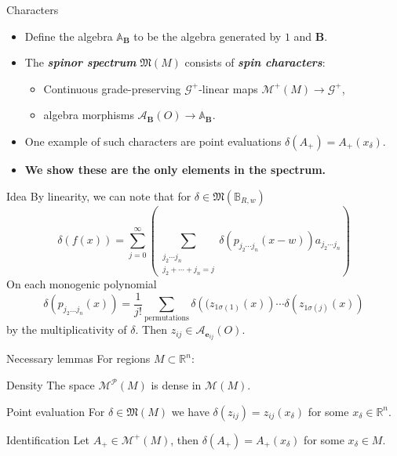 \documentclass[aspectratio=169,handout]{beamer}
\newcommand\boldgreen[1]{\textcolor{lighter_csu_green}{\emph{\textbf{#1}}}}
\newcommand\boldgold[1]{\textcolor{csu_gold}{\textbf{#1}}}
\newcommand{\R}{\mathbb{R}}
\newcommand{\algebra}{\mathcal{A}}
\newcommand{\G}{\mathcal{G}}
\newcommand{\characters}{\mathfrak{M}}
\newcommand{\monogenics}{\mathcal{M}}
\newcommand{\ball}{\mathbb{B}}
\newcommand{\blade}[1]{\boldsymbol{#1}}
\newcommand{\bivector}{\blade{B}}
\begin{document}
\begin{frame}{Characters}
\vfill
\begin{itemize}
\pause
\item Define the algebra $\mathbb{A}_{\bivector}$ to be the algebra generated by $1$ and $\bivector$.
\pause
\item The \boldgreen{spinor spectrum} $\characters(M)$ consists of \boldgreen{spin characters}:
\begin{itemize}
  \item Continuous grade-preserving $\G^+$-linear maps $\monogenics^+(M) \to \G^+$,
  \item algebra morphisms $\algebra_{\bivector}(O) \to \mathbb{A}_{\bivector}$.
\end{itemize}
\pause
\item One example of such characters are point evaluations $\delta(A_+)=A_+(x_\delta)$.
\pause
\item \boldgold{We show these are the only elements in the spectrum.}
\end{itemize}
\vfill
\end{frame}

\begin{frame}{Idea}
\vfill
\pause By linearity, we can note that for $\delta \in \characters(\ball_{R,w})$
\[
\delta(f(x)) = \sum_{j=0}^\infty \left(\sum_{\substack{{j_2 \cdots j_n} \\ {j_2 + \cdots + j_n = j}}} \delta(p_{j_2 \cdots j_n} (x-w)) a_{j_2 \cdots j_n} \right)
\]
\pause On each monogenic polynomial
\[
\delta(p_{j_2 \dots j_n}(x)) = \frac{1}{j!} \sum_{\textrm{permutations}}\delta\left((z_{1\sigma(1)}(x)\right) \cdots \delta\left(z_{1\sigma(j)}(x)\right)
\]
by the multiplicativity of $\delta$. \pause Then $z_{ij} \in \algebra_{\blade{e}_{ij}}(O)$.
\vfill
\end{frame}


\begin{frame}{Necessary lemmas}
\vfill
\pause
For regions $M\subset \R^n$:
\pause
\begin{lemm*}{Density}{}
The space $\monogenics^\mathcal{P}(M)$ is dense in $\monogenics(M)$.
\end{lemm*}
\pause
\begin{lemm*}{Point evaluation}{}
For $\delta \in \characters(M)$ we have $\delta(z_{ij})=z_{ij}(x_\delta)$ for some $x_\delta \in \R^n$.
\end{lemm*}
\pause
\begin{lemm*}{Identification}{}
Let $A_+\in \mathcal{M}^+(M)$, then $\delta (A_+)=A_+(x_\delta)$ for some $x_\delta \in M$.
\end{lemm*}
\vfill
\end{frame}
\end{document}
